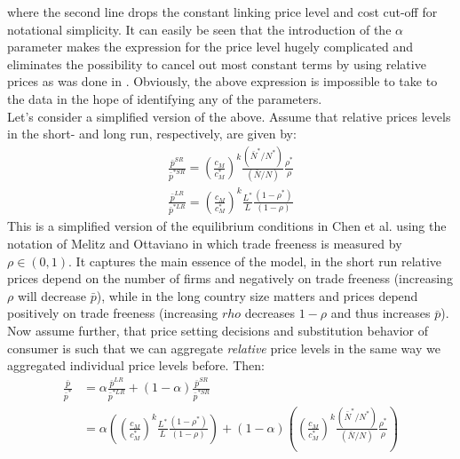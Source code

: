 \documentclass[a4paper,12pt]{article}
\begin{document}
where the second line drops the constant linking price level and cost cut-off for notational simplicity. It can easily be seen that the introduction of the $\alpha$ parameter makes the expression for the price level hugely complicated and eliminates the possibility to cancel out most constant terms by using relative prices as was done in \citet{Chen2009}. Obviously, the above expression is impossible to take to the data in the hope of identifying any of the parameters. \\
Let's consider a simplified version of the above. Assume that relative prices levels in the short- and long run, respectively, are given by:
\begin{align*}
\frac{\bar{p}^{SR}}{\bar{p}^{*SR}} = \left( \frac{c_M}{c_M^*} \right)^k \frac{(\bar{N}^* / N^*)}{(\bar{N} / N)} \frac{\rho^*}{\rho} \\
\frac{\bar{p}^{LR}}{\bar{p}^{*LR}} = \left( \frac{c_M}{c_M^*} \right)^k \frac{L^*}{L} \frac{(1-\rho^*)}{(1-\rho)}
\end{align*}
This is a simplified version of the equilibrium conditions in Chen et al. using the notation of Melitz and Ottaviano in which trade freeness is measured by $\rho \in (0,1)$. It captures the main essence of the model, in the short run relative prices depend on the number of firms and negatively on trade freeness (increasing $\rho$ will decrease $\bar{p}$), while in the long country size matters and prices depend positively on trade freeness (increasing $rho$ decreases $1-\rho$ and thus increases $\bar{p}$). Now assume further, that price setting decisions and substitution behavior of consumer is such that we can aggregate \textit{relative} price levels in the same way we aggregated individual price levels before. Then:
\begin{align*}
\frac{\bar{p}}{\bar{p}^*} &= \alpha \frac{\bar{p}^{LR}}{\bar{p}^{*LR}} + (1-\alpha) \frac{\bar{p}^{SR}}{\bar{p}^{*SR}} \\
													&= \alpha \left( \left( \frac{c_M}{c_M^*} \right)^k \frac{L^*}{L} \frac{(1-\rho^*)}{(1-\rho)} \right) + (1-\alpha) \left( \left( \frac{c_M}{c_M^*} \right)^k \frac{(\bar{N}^* / N^*)}{(\bar{N} / N)} \frac{\rho^*}{\rho} \right)
\end{align*}
\end{document}

